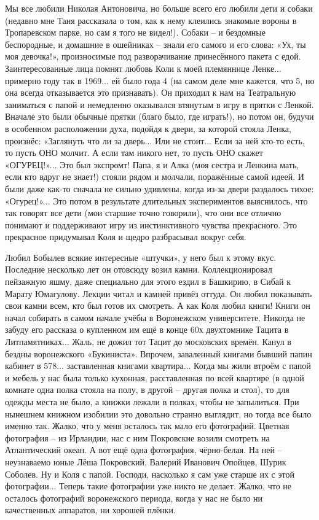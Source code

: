 Мы все любили Николая Антоновича, но больше всего его любили дети и собаки (недавно мне Таня рассказала о том, как к нему клеились знакомые вороны в Тропаревском парке, но сам я того не видел!). Собаки – и бездомные беспородные, и домашние в ошейниках – знали его самого и его слова: «Ух, ты моя девочка!», произносимые под разворачивание принесённого пакета с едой. Заинтересованные лица помнят любовь Коли к моей племяннице Ленке... примерно году так в 1969... ей было года 4 (на самом деле мне кажется, что 5, но она всегда отказывается это признавать). Он приходил к нам на Театральную заниматься с папой и немедленно оказывался втянутым в игру в прятки с Ленкой. Вначале это были обычные прятки (благо было, где играть!), но потом он, будучи в особенном расположении духа, подойдя к двери, за которой стояла Ленка, произнёс: «Заглянуть что ли за дверь... Или не стоит... Если за ней кто-то есть, то пусть ОНО молчит. А если там никого нет, то пусть ОНО скажет «ОГУРЕЦ!»... Это был экспромт! Папа, я и Алка (моя сестра и Ленкина мать, если кто вдруг не знает!) стояли рядом и молчали, поражённые самой идеей. И были даже как-то сначала не сильно удивлены, когда из-за двери раздалось тихое: «Огурец!»... Это потом в результате длительных экспериментов выяснилось, что так говорят все дети (мои старшие точно говорили), что они все отлично понимают и поддерживают игру из инстинктивного чувства прекрасного. Это прекрасное придумывал Коля и щедро разбрасывал вокруг себя.

Любил Бобылев всякие интересные «штучки», у него
\linebreak
был к этому вкус.
Последние несколько лет он отовсюду возил камни. Коллекционировал пейзажную яшму, даже специально для этого ездил в Башкирию, в Сибай к Марату Юмагулову. Лекции читал и камней привёз оттуда. Он любил показывать свои камни всем, кто был готов их смотреть. А как Коля любил книги! Книги он начал собирать в самом начале учёбы в Воронежском университете. Никогда не забуду его рассказа о купленном им ещё в конце 60х двухтомнике Тацита в Литпамятниках... Жаль, не дожил тот Тацит до московских времён. Канул в бездны воронежского «Букиниста». Впрочем, заваленный книгами бывший папин кабинет в 578... заставленная книгами квартира... Когда мы жили втроём с папой и мебель у нас была только кухонная, расставленная по всей квартире (в одной комнате одна полка стояла на полу, в другой – другая полка и стол), то для одежды места не было, а книжки лежали в полках, чтобы не запылиться. При нынешнем книжном изобилии это довольно странно выглядит, но тогда все было именно так.
Жалко, что у меня осталось так мало его фотографий. Цветная фотография – из Ирландии, нас с ним Покровские возили смотреть на Атлантический океан. А вот ещё одна фотография, чёрно-белая. На ней – неузнаваемо юные Лёша Покровский, Валерий Иванович Опойцев, Шурик Соболев. Ну и Коля с папой. Господи, насколько я сам уже старше их с этой фотографии... Теперь такие фотографии уже никто не делает. Жалко, что не осталось фотографий воронежского периода, когда у нас не было ни качественных аппаратов, ни хорошей плёнки.

